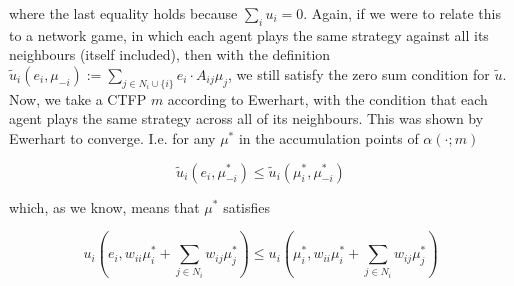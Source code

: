 \documentclass{article}
\theoremstyle{definition}
\begin{document}
	where the last equality holds because $\sum_i u_i = 0$. Again, if we were to relate this to a network game, in which each agent plays the same strategy against all its neighbours (itself included), then with the definition $ \tilde{u}_i (e_i, \mu_{-i}) := \sum_{j \in N_i \cup \{i\}} e_i \cdot A_{ij} \mu_j$, we still satisfy the zero sum condition for $\tilde{u}$. Now, we take a CTFP $m$ according to Ewerhart, with the condition that each agent plays the same strategy across all of its neighbours. This was shown by Ewerhart to converge. I.e. for any $\mu^*$ in the accumulation points of $\alpha(\cdot; m)$
	
	\begin{equation*}
		\tilde{u}_i(e_i, \mu_{-i}^*) \leq \tilde{u}_i(\mu_i^*, \mu_{-i}^*)
	\end{equation*}
	
	which, as we know, means that $\mu^*$ satisfies
	
	\begin{equation*}
		u_i(e_i, w_{ii} \mu_i^* + \sum_{j \in N_i} w_{ij} \mu_j^*) \leq  u_i(\mu_i^*, w_{ii} \mu_i^* + \sum_{j \in N_i} w_{ij} \mu_j^*)
	\end{equation*}
	
	
\end{document}
